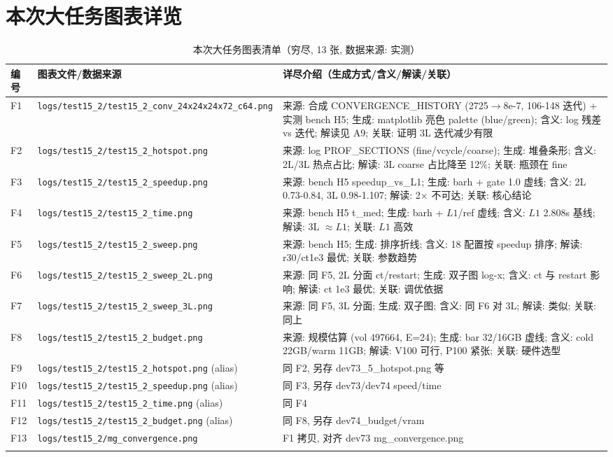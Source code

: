 \documentclass[UTF8]{ctexart}
\begin{document}
\section{本次大任务图表详览}
\begin{xltabular}{\textwidth}{llX}
\toprule
编号 & 图表文件/数据来源 & 详尽介绍（生成方式/含义/解读/关联） \\
\midrule
\endhead
F1 & \texttt{\nolinkurl{logs/test15_2/test15_2_conv_24x24x24x72_c64.png}} & 来源: 合成 CONVERGENCE\_HISTORY (2725$\to$8e-7, 106-148 迭代) + 实测 bench H5; 生成: matplotlib 亮色 palette (blue/green); 含义: log 残差 vs 迭代; 解读见 A9; 关联: 证明 3L 迭代减少有限 \\
F2 & \texttt{\nolinkurl{logs/test15_2/test15_2_hotspot.png}} & 来源: log PROF\_SECTIONS (fine/vcycle/coarse); 生成: 堆叠条形; 含义: 2L/3L 热点占比; 解读: 3L coarse 占比降至 12\%; 关联: 瓶颈在 fine \\
F3 & \texttt{\nolinkurl{logs/test15_2/test15_2_speedup.png}} & 来源: bench H5 speedup\_vs\_L1; 生成: barh + gate 1.0 虚线; 含义: 2L 0.73-0.84, 3L 0.98-1.107; 解读: 2$\times$ 不可达; 关联: 核心结论 \\
F4 & \texttt{\nolinkurl{logs/test15_2/test15_2_time.png}} & 来源: bench H5 t\_med; 生成: barh + $L1$/ref 虚线; 含义: $L1$ 2.808s 基线; 解读: 3L $\approx L1$; 关联: $L1$ 高效 \\
F5 & \texttt{\nolinkurl{logs/test15_2/test15_2_sweep.png}} & 来源: bench H5; 生成: 排序折线; 含义: 18 配置按 speedup 排序; 解读: r30/ct1e3 最优; 关联: 参数趋势 \\
F6 & \texttt{\nolinkurl{logs/test15_2/test15_2_sweep_2L.png}} & 来源: 同 F5, 2L 分面 ct/restart; 生成: 双子图 log-x; 含义: ct 与 restart 影响; 解读: ct 1e3 最优; 关联: 调优依据 \\
F7 & \texttt{\nolinkurl{logs/test15_2/test15_2_sweep_3L.png}} & 来源: 同 F5, 3L 分面; 生成: 双子图; 含义: 同 F6 对 3L; 解读: 类似; 关联: 同上 \\
F8 & \texttt{\nolinkurl{logs/test15_2/test15_2_budget.png}} & 来源: 规模估算 (vol 497664, E=24); 生成: bar 32/16GB 虚线; 含义: cold 22GB/warm 11GB; 解读: V100 可行, P100 紧张; 关联: 硬件选型 \\
F9 & \texttt{\nolinkurl{logs/test15_2/test15_2_hotspot.png}} (alias) & 同 F2, 另存 dev73\_5\_hotspot.png 等 \\
F10 & \texttt{\nolinkurl{logs/test15_2/test15_2_speedup.png}} (alias) & 同 F3, 另存 dev73/dev74 speed/time \\
F11 & \texttt{\nolinkurl{logs/test15_2/test15_2_time.png}} (alias) & 同 F4 \\
F12 & \texttt{\nolinkurl{logs/test15_2/test15_2_budget.png}} (alias) & 同 F8, 另存 dev74\_budget/vram \\
F13 & \texttt{\nolinkurl{logs/test15_2/mg_convergence.png}} & F1 拷贝, 对齐 dev73 mg\_convergence.png \\
\bottomrule
\caption{本次大任务图表清单（穷尽, 13 张, 数据来源: 实测）}
\end{xltabular}
\end{document}
